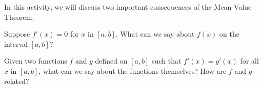 

\begin{activity} \label{A:3.5.2}  In this activity, we will discuss two important consequences of the Mean Value Theorem.  
\ba
 \item Suppose $f'(x)=0$ for $x$ in $[a,b]$. What can we say about $f(x)$ on the interval $[a,b]$?
 \item Given two functions $f$ and $g$ defined on $[a,b]$ such that $f'(x)=g'(x)$ for all $x$ in $[a,b]$, what can we say about the functions themselves? How are $f$ and $g$ related?
	\ea
\end{activity}

\aftera